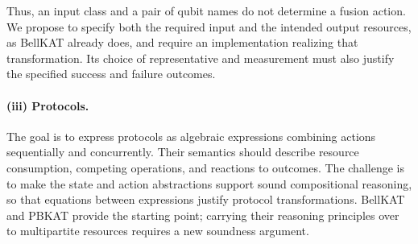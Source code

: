 Thus, an input class and a pair of qubit names do not determine a fusion action. We propose to specify both the required input and the intended output resources, as BellKAT already does, and require an implementation realizing that transformation. Its choice of representative and measurement must also justify the specified success and failure outcomes.

\paragraph{(iii) Protocols.}
The goal is to express protocols as algebraic expressions combining actions sequentially and concurrently. Their semantics should describe resource consumption, competing operations, and reactions to outcomes. The challenge is to make the state and action abstractions support sound compositional reasoning, so that equations between expressions justify protocol transformations. BellKAT and PBKAT provide the starting point; carrying their reasoning principles over to multipartite resources requires a new soundness argument.
